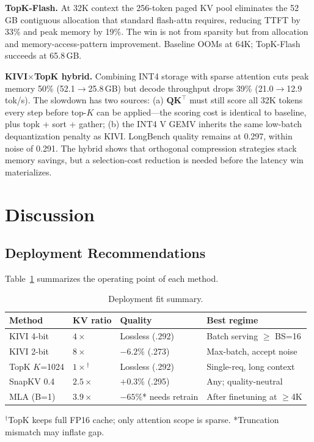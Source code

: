 \documentclass[conference]{IEEEtran}
\begin{document}
\textbf{TopK-Flash.}  At 32K context the 256-token paged KV pool
eliminates the 52\,GB contiguous allocation that standard flash-attn
requires, reducing TTFT by 33\% and peak memory by 19\%.  The win is
not from sparsity but from allocation and memory-access-pattern
improvement.  Baseline OOMs at 64K; TopK-Flash succeeds at 65.8\,GB.

\textbf{KIVI$\times$TopK hybrid.}  Combining INT4 storage with sparse
attention cuts peak memory 50\% (52.1$\rightarrow$25.8\,GB) but decode
throughput drops 39\% (21.0$\rightarrow$12.9\,tok/s).  The slowdown has
two sources: (a) $\mathbf{Q}\mathbf{K}^\top$ must still score all 32K
tokens every step before top-$K$ can be applied---the scoring cost is
identical to baseline, plus topk + sort + gather; (b) the INT4 V GEMV
inherits the same low-batch dequantization penalty as KIVI.  LongBench
quality remains at 0.297, within noise of 0.291.  The hybrid shows
that orthogonal compression strategies stack memory savings, but a
selection-cost reduction is needed before the latency win materializes.

\section{Discussion}

\subsection{Deployment Recommendations}

Table~\ref{tab:tradeoff} summarizes the operating point of each method.

\begin{table}[!t]
\centering
\caption{Deployment fit summary.}
\label{tab:tradeoff}
\setlength{\tabcolsep}{3pt}
\begin{tabular}{@{}llll@{}}
\toprule
\textbf{Method} & \textbf{KV ratio} & \textbf{Quality} & \textbf{Best regime} \\
\midrule
KIVI 4-bit  & $4\times$  & Lossless (.292)        & Batch serving $\geq$ BS=16 \\
KIVI 2-bit  & $8\times$  & $-6.2\%$ (.273)        & Max-batch, accept noise \\
TopK $K$=1024 & $1\times$$^{\dagger}$ & Lossless (.292) & Single-req, long context \\
SnapKV 0.4  & $2.5\times$ & $+0.3\%$ (.295)       & Any; quality-neutral \\
MLA (B=1)   & $3.9\times$ & $-65\%$* needs retrain & After finetuning at $\geq$4K \\
\bottomrule
\end{tabular}
\vspace{1pt}
\footnotesize{$^{\dagger}$TopK keeps full FP16 cache; only attention scope is sparse.  *Truncation mismatch may inflate gap.}
\end{table}
\end{document}
